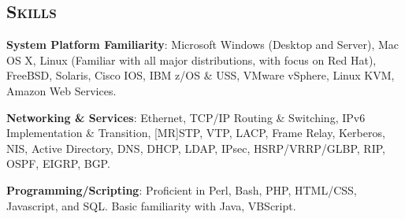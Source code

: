 \begin{resume}




\section{\textsc{Skills}}

\textbf{System Platform Familiarity}: Microsoft Windows (Desktop and Server), Mac OS X, Linux (Familiar with all major distributions, with focus on Red Hat), FreeBSD, Solaris, Cisco IOS, IBM z/OS \& USS, VMware vSphere, Linux KVM, Amazon Web Services.

\textbf{Networking \& Services}: Ethernet, TCP/IP Routing \& Switching, IPv6 Implementation \& Transition, [MR]STP, VTP, LACP, Frame Relay, Kerberos, NIS, Active Directory, DNS, DHCP, LDAP, IPsec, HSRP/VRRP/GLBP, RIP, OSPF, EIGRP, BGP.

\textbf{Programming/Scripting}: Proficient in Perl, Bash, PHP, HTML/CSS, Javascript, and SQL. Basic familiarity with Java, VBScript.








\end{resume}
